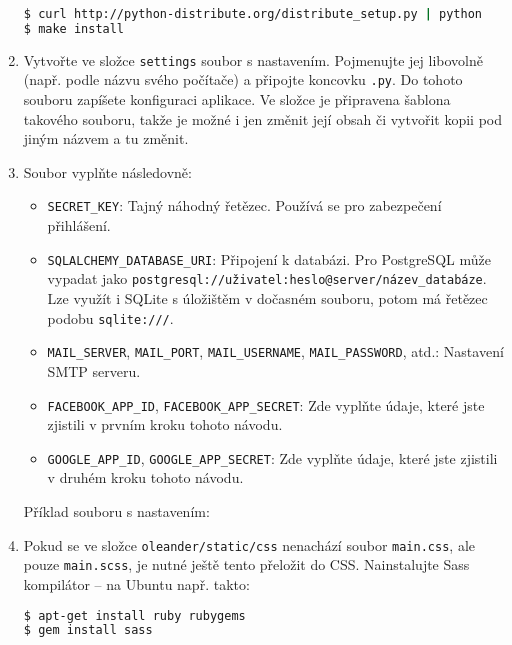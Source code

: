 \documentclass[12pt,oneside,final]{fithesis2}
\begin{document}
\begin{enumerate}
        \begin{lstlisting}[language=bash]
$ curl http://python-distribute.org/distribute_setup.py | python
$ make install
        \end{lstlisting}

    \item Vytvořte ve složce {\tt settings} soubor s nastavením. Pojmenujte jej libovolně (např. podle názvu svého počítače) a připojte koncovku {\tt .py}. Do tohoto souboru zapíšete konfiguraci aplikace. Ve složce je připravena šablona takového souboru, takže je možné i jen změnit její obsah či vytvořit kopii pod jiným názvem a tu změnit.

    \item Soubor vyplňte následovně:

        \begin{itemize}
            \item {\tt SECRET\_KEY}: Tajný náhodný řetězec. Používá se pro zabezpečení přihlášení.
            \item {\tt SQLALCHEMY\_DATABASE\_URI}: Připojení k databázi. Pro PostgreSQL může vypadat jako {\tt post\-gresql://uživa\-tel:hes\-lo@ser\-ver/ná\-zev\_data\-báze}. Lze využít i SQLite s úložištěm v dočasném souboru, potom má řetězec podobu {\tt sqlite:///}.
            \item {\tt MAIL\_SERVER}, {\tt MAIL\_PORT}, {\tt MAIL\_USER\-NAME}, {\tt MAIL\_PASS\-WORD}, atd.: Nastavení SMTP serveru.
            \item {\tt FACEBOOK\_APP\_ID}, {\tt FACEBOOK\_APP\_SECRET}: Zde vyplňte údaje, které jste zjistili v prvním kroku tohoto návodu.
            \item {\tt GOOGLE\_APP\_ID}, {\tt GOOGLE\_APP\_SECRET}: Zde vyplňte údaje, které jste zjistili v druhém kroku tohoto návodu.
        \end{itemize}

    Příklad souboru s nastavením:

        

    \item Pokud se ve složce {\tt oleander/static/css} nenachází soubor {\tt main.css}, ale pouze {\tt main.scss}, je nutné ještě tento přeložit do CSS. Nainstalujte Sass kompilátor -- na Ubuntu např. takto:

        \begin{lstlisting}[language=bash]
$ apt-get install ruby rubygems
$ gem install sass
        \end{lstlisting}


\end{enumerate}
\end{document}
